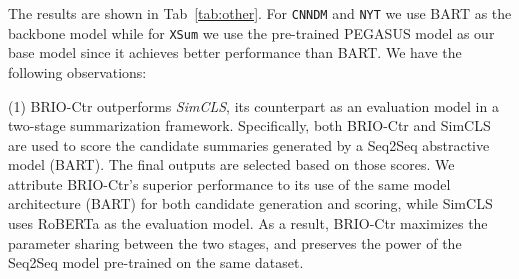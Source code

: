 \documentclass[11pt]{article}
\newcommand{\model}{BRIO\xspace}
\begin{document}
The results are shown in Tab~\ref{tab:other}.
For \texttt{CNNDM} and \texttt{NYT} we use BART as the backbone model while for \texttt{XSum} we use the pre-trained PEGASUS model as our base model since it achieves better performance than BART.
We have the following observations:


(1) \model-Ctr outperforms \textit{SimCLS}, its counterpart as an evaluation model in a two-stage summarization framework.
Specifically, both \model-Ctr and SimCLS are used to score the candidate summaries generated by a Seq2Seq abstractive model (BART).
The final outputs are selected based on those scores.
We attribute \model-Ctr's superior performance to its use of the same model architecture (BART) for both candidate generation and scoring, while SimCLS uses RoBERTa as the evaluation model.
As a result, \model-Ctr maximizes the parameter sharing between the two stages, and preserves the power of the Seq2Seq model pre-trained on the same dataset.
\end{document}
